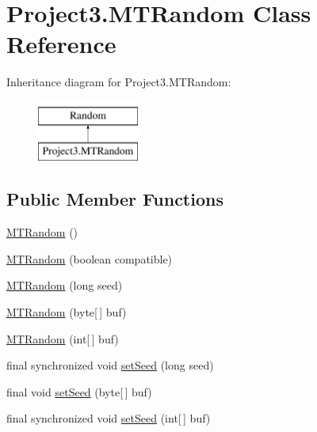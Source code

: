 \hypertarget{class_project3_1_1_m_t_random}{}\section{Project3.\+M\+T\+Random Class Reference}
\label{class_project3_1_1_m_t_random}
Inheritance diagram for Project3.\+M\+T\+Random\+:\begin{figure}[H]
\begin{center}
\leavevmode
\includegraphics[height=2.000000cm]{class_project3_1_1_m_t_random}
\end{center}
\end{figure}
\subsection*{Public Member Functions}
\begin{DoxyCompactItemize}
\item 
\mbox{\hyperlink{class_project3_1_1_m_t_random_a53aed3686fa87293ed7b65b706086dab}{M\+T\+Random}} ()
\item 
\mbox{\hyperlink{class_project3_1_1_m_t_random_acf5fc01aeb0d6edfaf1c514159e7d1db}{M\+T\+Random}} (boolean compatible)
\item 
\mbox{\hyperlink{class_project3_1_1_m_t_random_a302f2ba4ac375c97e7d1b71017f272ba}{M\+T\+Random}} (long seed)
\item 
\mbox{\hyperlink{class_project3_1_1_m_t_random_aa76f9e441fff43fc2d1d84c3b33a2535}{M\+T\+Random}} (byte\mbox{[}$\,$\mbox{]} buf)
\item 
\mbox{\hyperlink{class_project3_1_1_m_t_random_ad01dc6b80432b956ebe61d3b9b320355}{M\+T\+Random}} (int\mbox{[}$\,$\mbox{]} buf)
\item 
final synchronized void \mbox{\hyperlink{class_project3_1_1_m_t_random_a96cf558539a32642af9ae2fd51b0ad9f}{set\+Seed}} (long seed)
\item 
final void \mbox{\hyperlink{class_project3_1_1_m_t_random_a3f346d0c56b39096e1a29f2bf12c2dec}{set\+Seed}} (byte\mbox{[}$\,$\mbox{]} buf)
\item 
final synchronized void \mbox{\hyperlink{class_project3_1_1_m_t_random_a4ac05e6ef57dbaa67596e3de3d9e5d49}{set\+Seed}} (int\mbox{[}$\,$\mbox{]} buf)
\end{DoxyCompactItemize}
